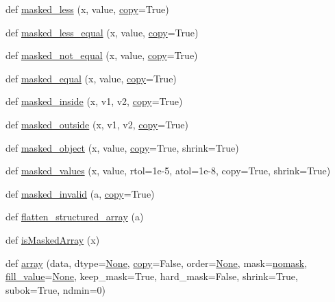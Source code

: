 \begin{DoxyCompactItemize}
\item 
def \hyperlink{namespacenumpy_1_1ma_1_1core_adf8c1570bc23816eafa836c71bef39af}{masked\+\_\+less} (x, value, \hyperlink{namespacenumpy_1_1ma_1_1core_a9eadff0419a718d13488bd60175f825d}{copy}=True)
\item 
def \hyperlink{namespacenumpy_1_1ma_1_1core_a612bd38a974042ae10103c95c9cacc16}{masked\+\_\+less\+\_\+equal} (x, value, \hyperlink{namespacenumpy_1_1ma_1_1core_a9eadff0419a718d13488bd60175f825d}{copy}=True)
\item 
def \hyperlink{namespacenumpy_1_1ma_1_1core_ab70d2de830313407e90ce5a8e1fe51ba}{masked\+\_\+not\+\_\+equal} (x, value, \hyperlink{namespacenumpy_1_1ma_1_1core_a9eadff0419a718d13488bd60175f825d}{copy}=True)
\item 
def \hyperlink{namespacenumpy_1_1ma_1_1core_a001a5dffe6870e8ffa646499d498ec2f}{masked\+\_\+equal} (x, value, \hyperlink{namespacenumpy_1_1ma_1_1core_a9eadff0419a718d13488bd60175f825d}{copy}=True)
\item 
def \hyperlink{namespacenumpy_1_1ma_1_1core_a23100c958cb0127c04218abc8cb96da5}{masked\+\_\+inside} (x, v1, v2, \hyperlink{namespacenumpy_1_1ma_1_1core_a9eadff0419a718d13488bd60175f825d}{copy}=True)
\item 
def \hyperlink{namespacenumpy_1_1ma_1_1core_aa9fa72af95fe85b102c5fc38cceb50f5}{masked\+\_\+outside} (x, v1, v2, \hyperlink{namespacenumpy_1_1ma_1_1core_a9eadff0419a718d13488bd60175f825d}{copy}=True)
\item 
def \hyperlink{namespacenumpy_1_1ma_1_1core_a145c2a13a87bc66d481219ca8c1496f7}{masked\+\_\+object} (x, value, \hyperlink{namespacenumpy_1_1ma_1_1core_a9eadff0419a718d13488bd60175f825d}{copy}=True, shrink=True)
\item 
def \hyperlink{namespacenumpy_1_1ma_1_1core_a70c5c910690e11346059238b0e0d1d72}{masked\+\_\+values} (x, value, rtol=1e-\/5, atol=1e-\/8, copy=\+True, shrink=\+True)
\item 
def \hyperlink{namespacenumpy_1_1ma_1_1core_a7195e11522e90711c9f3a792ab8786cc}{masked\+\_\+invalid} (a, \hyperlink{namespacenumpy_1_1ma_1_1core_a9eadff0419a718d13488bd60175f825d}{copy}=True)
\item 
def \hyperlink{namespacenumpy_1_1ma_1_1core_aab33bfa37f11550add6d197bce6c1ecb}{flatten\+\_\+structured\+\_\+array} (a)
\item 
def \hyperlink{namespacenumpy_1_1ma_1_1core_a2178e119b434c64accd38693f05d5f22}{is\+Masked\+Array} (x)
\item 
def \hyperlink{namespacenumpy_1_1ma_1_1core_ae4c7868c066019a67e77b8e3015595ab}{array} (data, dtype=\hyperlink{namespacenumpy_1_1ma_1_1core_a647ee1848dfa3692fe35a663a2aa40b3}{None}, \hyperlink{namespacenumpy_1_1ma_1_1core_a9eadff0419a718d13488bd60175f825d}{copy}=False, order=\hyperlink{namespacenumpy_1_1ma_1_1core_a647ee1848dfa3692fe35a663a2aa40b3}{None}, mask=\hyperlink{namespacenumpy_1_1ma_1_1core_abafbbb38c7afc60936cc5a55fa23ecfa}{nomask}, \hyperlink{namespacenumpy_1_1ma_1_1core_ae299ee1b3a1e5865fcdc6ca98dbe24d2}{fill\+\_\+value}=\hyperlink{namespacenumpy_1_1ma_1_1core_a647ee1848dfa3692fe35a663a2aa40b3}{None}, keep\+\_\+mask=True, hard\+\_\+mask=False, shrink=True, subok=True, ndmin=0)

\end{DoxyCompactItemize}
